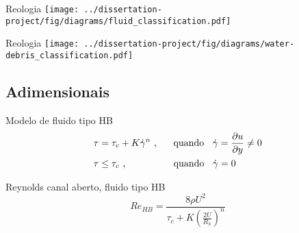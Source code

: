 \begin{frame}{Reologia}
    \texttt{[image: ../dissertation-project/fig/diagrams/fluid\_classification.pdf]}
\end{frame}

\begin{frame}{Reologia}
    \centering
    \texttt{[image: ../dissertation-project/fig/diagrams/water-debris\_classification.pdf]}
\end{frame}

\subsection{Adimensionais}

\begin{frame}

    \begin{exampleblock}{Modelo de fluido tipo HB}
        \begin{equation}
            \label{eq:HB_shear_stress}
            \begin{split}
                \tau &= \tau_c + K \dot{\gamma}^n
                \text{ ,\hspace{0.5 cm} quando \hspace{0.2cm}} \dot{\gamma} = \frac{\partial u}{\partial y} \ne 0
                \\
                \tau &\leq \tau_c
                \text{ ,\hspace{1.65cm} quando \hspace{0.2cm}} \dot{\gamma} = 0
            \end{split}
        \end{equation}
    \end{exampleblock}

    \begin{exampleblock}{Reynolds canal aberto, fluido tipo HB}
        \begin{equation}
            Re_{HB} = \frac{8 \rho U^2}{\tau_c + K \left( \frac{2U}{R_h} \right)^n}
        \end{equation}
    \end{exampleblock}

\end{frame}

